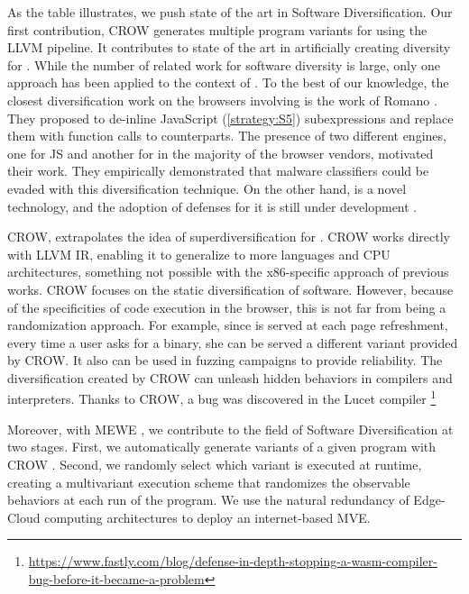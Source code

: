 As the table illustrates, we push state of the art in Software Diversification. Our first contribution, CROW \cite{CROW} generates multiple program variants for \wasm using the LLVM pipeline.
It contributes to state of the art in artificially creating diversity for \wasm. While the number of related work for software diversity is large, only one approach has been applied to the context of \wasm. To the best of our knowledge, the closest diversification work on the browsers involving \wasm is the work of Romano \etal \cite{wobfuscator}. They proposed to de-inline JavaScript (\autoref{strategy:S5}) subexpressions and replace them with function calls to \wasm counterparts. The presence of two different engines, one for JS and another for \wasm in the majority of the browser vendors, motivated their work. They empirically demonstrated that malware classifiers could be evaded with this diversification technique. On the other hand, \wasm is a novel technology, and the adoption of defenses for it is still under development \cite{Narayan2021Swivel, johnson2021}.

CROW, extrapolates the idea of superdiversification \cite{jacob2008superdiversifier} for \wasm. CROW works directly with LLVM IR, enabling it to generalize to more languages and CPU architectures, something not possible with the x86-specific approach of previous works.
CROW focuses on the static diversification of software. However, because of the specificities of code execution in the browser, this is not far from being a randomization approach. For example, since \wasm is served at each page refreshment, every time a user asks for a \wasm binary, she can be served a different variant provided by CROW.
It also can be used in fuzzing campaigns \citationneeded to provide reliability. The diversification created by CROW can unleash hidden behaviors in compilers and interpreters. Thanks to CROW, a bug was discovered in the Lucet compiler \footnote{\url{https://www.fastly.com/blog/defense-in-depth-stopping-a-wasm-compiler-bug-before-it-became-a-problem}} 


Moreover, with MEWE \cite{MEWE}, we contribute to the field of Software Diversification at two stages. First, we automatically generate variants of a given program with CROW \cite{CROW}. Second, we randomly select which variant is executed at runtime, creating a multivariant execution scheme that randomizes the observable behaviors at each run of the program. We use the natural redundancy of Edge-Cloud computing architectures to deploy an internet-based MVE.



